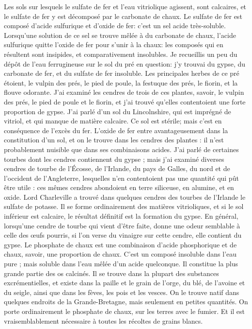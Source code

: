 Les sols sur lesquels le sulfate de fer et l'eau vitriolique agissent, sont calcaires, et le sulfate de fer y est décomposé par le carbonate de chaux. Le sulfate de fer est composé d'acide sulfurique et d'oxide de fer: c'est un sel acide très-soluble. Lorsqu'une solution de ce sel se trouve mêlée à du carbonate de chaux, l'acide sulfurique quitte l'oxide de fer pour s'unir à la chaux: les composés qui en résultent sont insipides, et comparativement insolubles.
Je recueillis un peu du dépôt de l'eau ferrugineuse sur le sol du pré en question: j'y trouvai du gypse, du carbonate de fer, et du sulfate de fer insoluble. Les principales herbes de ce pré étoient, le vulpin des prés, le pied de poule, la festuque des prés, le fiorin, et la flouve odorante.
J'ai examiné les cendres de trois de ces plantes, savoir, le vulpin des prés, le pied de poule et le fiorin, et j'ai trouvé qu'elles contentoient une forte proportion de gypse. J'ai parlé d'un sol du Lincolnshire, qui est imprégné de vitriol, et qui manque de matière calcaire. Ce sol est stérile; mais c'est en conséquence de l'excès du fer. L'oxide de\setcounter{page}{240} fer entre avantageusement dans la constitution d'un sol, et on le trouve dans les cendres des plantes : il n'est probablement nuisible que dans ses combinaisons acides.
J'ai parlé de certaines tourbes dont les cendres contiennent du gypse ; mais j'ai examiné diverses cendres de tourbe de l'Écosse, de l'Irlande, du pays de Galles, du nord et de l'occident de l'Angleterre, lesquelles n'en contentoient pas une quantité qui pût être utile : ces mêmes cendres abondoient en terre siliceuse, en alumine, et en oxide.
Lord Charleville a trouvé dans quelques cendres des tourbes de l'Irlande le sulfate de potasse.
Il se forme ordinairement des matières vitrioliques, et si le sol inférieur est calcaire, le résultat définitif est la formation du gypse.
En général, lorsqu'une cendre de tourbe qui vient d'être faite, donne une odeur semblable à celle des œufs pourris, si l'on verse du vinaigre sur cette cendre, elle contient du gypse.
Le phosphate de chaux est une combinaison d'acide phosphorique et de chaux, savoir, une proportion de chaux. C'est un composé insoluble dans l'eau pure ; mais soluble dans l'eau mêlée d'un acide quelconque. Il constitue la plus grande partie des os\setcounter{page}{241} calcinés. Il se trouve dans la plupart des substances excrémentielles, et existe dans la paille et le grain de l'orge, du blé, de l'avoine et du seigle, ainsi que dans les fèves, les pois et les vesces. On le trouve natif dans quelques endroits de la Grande-Bretagne, mais seulement en petites quantités. On porte ordinairement le phosphate de chaux, sur les terres avec le fumier. Et il est vraisemblablement nécessaire à toutes les récoltes de grains blancs.

